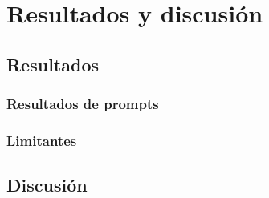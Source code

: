 \chapter{Resultados	y discusión}\label{cap:capitulo5}
\section{Resultados}\label{section:Resultados}


\subsection{Resultados de prompts}\label{section:Resultados}

\subsection{Limitantes}\label{section:Resultados}
\section{Discusión }\label{section:Discusión}
